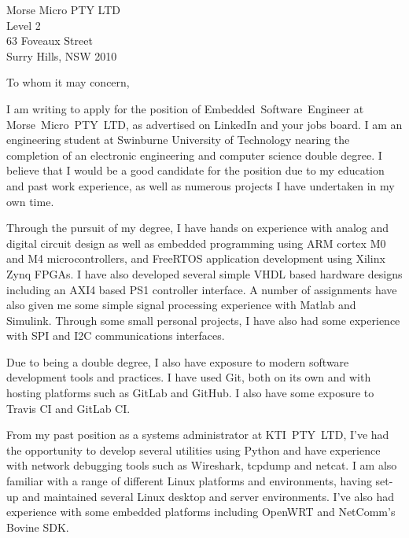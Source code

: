 \documentclass[
    backaddress=false,
    foldmarks=false,
    fromalign=right,
    fromrule,
    fromphone,
    fromemail,
    parskip=half,
    refline=nodate
]{scrlttr2}
\begin{document}
    


    \renewcommand*\raggedsignature{\raggedright}

    \begin{letter}{%
        Morse Micro PTY LTD \\
        Level 2               \\
        63 Foveaux Street     \\
        Surry Hills, NSW 2010}
        \opening{To whom it may concern,}
        \raggedbottom
        I am writing to apply for the position of Embedded~Software~Engineer at Morse~Micro~PTY~LTD, as advertised on LinkedIn and your jobs board. I am an engineering student at Swinburne University of Technology nearing the completion of an electronic engineering and computer science double degree. I believe that I would be a good candidate for the position due to my education and past work experience, as well as numerous projects I have undertaken in my own time.

        Through the pursuit of my degree, I have hands on experience with analog and digital circuit design as well as embedded programming using ARM cortex M0 and M4 microcontrollers, and FreeRTOS application development using Xilinx Zynq FPGAs. I have also developed several simple VHDL based hardware designs including an AXI4 based PS1 controller interface. A number of assignments have also given me some simple signal processing experience with Matlab and Simulink. Through some small personal projects, I have also had some experience with SPI and I2C communications interfaces.

        Due to being a double degree, I also have exposure to modern software development tools and practices. I have used Git, both on its own and with hosting platforms such as GitLab and GitHub. I also have some exposure to Travis CI and GitLab CI.
        
        From my past position as a systems administrator at KTI~PTY~LTD, I've had the opportunity to develop several utilities using Python and have experience with network debugging tools such as Wireshark, tcpdump and netcat. I am also familiar with a range of different Linux platforms and environments, having set-up and maintained several Linux desktop and server environments. I've also had experience with some embedded platforms including OpenWRT and NetComm's Bovine SDK.


\end{letter}
\end{document}

